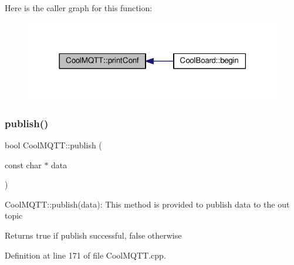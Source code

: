 Here is the caller graph for this function\+:\nopagebreak
\begin{figure}[H]
\begin{center}
\leavevmode
\includegraphics[width=318pt]{class_cool_m_q_t_t_a40553a0ad4b5ecf1cb4411ab54ca85fb_icgraph}
\end{center}
\end{figure}
\mbox{\label{class_cool_m_q_t_t_ace977b3e90ab14b1199fe5c4fb0a13ec}} 
\subsubsection{\texorpdfstring{publish()}{publish()}\hspace{0.1cm}{\footnotesize\ttfamily [1/2]}}
{\footnotesize\ttfamily bool Cool\+M\+Q\+T\+T\+::publish (\begin{DoxyParamCaption}\item[{const char $\ast$}]{data }\end{DoxyParamCaption})}

Cool\+M\+Q\+T\+T\+::publish(data)\+: This method is provided to publish data to the out topic

\begin{DoxyReturn}{Returns}
true if publish successful, false otherwise 
\end{DoxyReturn}


Definition at line 171 of file Cool\+M\+Q\+T\+T.\+cpp.

